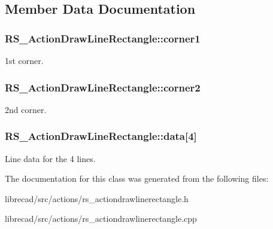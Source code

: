\subsection{Member Data Documentation}
\hypertarget{classRS__ActionDrawLineRectangle_a01c8a7aa17832e4822c40ce96436414b}{
\subsubsection[{corner1}]{ R\-S\-\_\-\-Action\-Draw\-Line\-Rectangle\-::corner1\hspace{0.3cm}{\ttfamily [protected]}}}\label{classRS__ActionDrawLineRectangle_a01c8a7aa17832e4822c40ce96436414b}
1st corner. \hypertarget{classRS__ActionDrawLineRectangle_a8747329fd78c9fd9a396aad092138be7}{
\subsubsection[{corner2}]{ R\-S\-\_\-\-Action\-Draw\-Line\-Rectangle\-::corner2\hspace{0.3cm}{\ttfamily [protected]}}}\label{classRS__ActionDrawLineRectangle_a8747329fd78c9fd9a396aad092138be7}
2nd corner. \hypertarget{classRS__ActionDrawLineRectangle_a723761bc55877717efebafbc7969aff9}{
\subsubsection[{data}]{ R\-S\-\_\-\-Action\-Draw\-Line\-Rectangle\-::data\mbox{[}4\mbox{]}\hspace{0.3cm}{\ttfamily [protected]}}}\label{classRS__ActionDrawLineRectangle_a723761bc55877717efebafbc7969aff9}
Line data for the 4 lines. 

The documentation for this class was generated from the following files\-:\begin{DoxyCompactItemize}
\item 
librecad/src/actions/rs\-\_\-actiondrawlinerectangle.\-h\item 
librecad/src/actions/rs\-\_\-actiondrawlinerectangle.\-cpp\end{DoxyCompactItemize}
